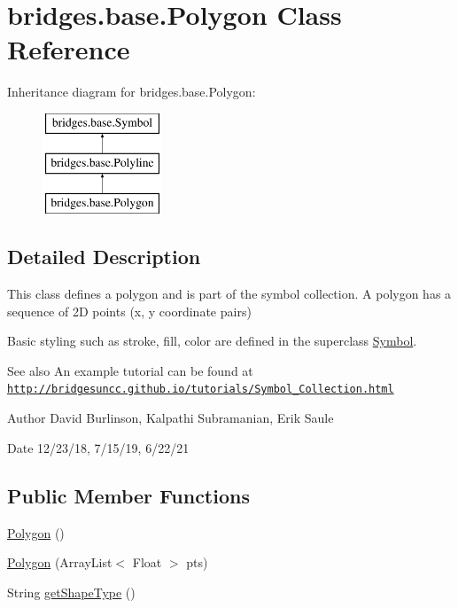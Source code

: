 \hypertarget{classbridges_1_1base_1_1_polygon}{}\section{bridges.\+base.\+Polygon Class Reference}
\label{classbridges_1_1base_1_1_polygon}
Inheritance diagram for bridges.\+base.\+Polygon\+:\begin{figure}[H]
\begin{center}
\leavevmode
\includegraphics[height=3.000000cm]{classbridges_1_1base_1_1_polygon}
\end{center}
\end{figure}


\subsection{Detailed Description}
This class defines a polygon and is part of the symbol collection. A polygon has a sequence of 2D points (x, y coordinate pairs) 

Basic styling such as stroke, fill, color are defined in the superclass \hyperlink{classbridges_1_1base_1_1_symbol}{Symbol}.

\begin{DoxySeeAlso}{See also}
An example tutorial can be found at \href{http://bridgesuncc.github.io/tutorials/Symbol_Collection.html}{\tt http\+://bridgesuncc.\+github.\+io/tutorials/\+Symbol\+\_\+\+Collection.\+html}
\end{DoxySeeAlso}
\begin{DoxyAuthor}{Author}
David Burlinson, Kalpathi Subramanian, Erik Saule 
\end{DoxyAuthor}
\begin{DoxyDate}{Date}
12/23/18, 7/15/19, 6/22/21 
\end{DoxyDate}
\subsection*{Public Member Functions}
\begin{DoxyCompactItemize}
\item 
\hyperlink{classbridges_1_1base_1_1_polygon_af0c1b3bc3147ffbda98fd9c515a8052d}{Polygon} ()
\item 
\hyperlink{classbridges_1_1base_1_1_polygon_a341cc297ba7f0f201d31aa3c98ecf108}{Polygon} (Array\+List$<$ Float $>$ pts)
\item 
String \hyperlink{classbridges_1_1base_1_1_polygon_a1d9ab114712eacf9c08edc0377e8330c}{get\+Shape\+Type} ()
\end{DoxyCompactItemize}
